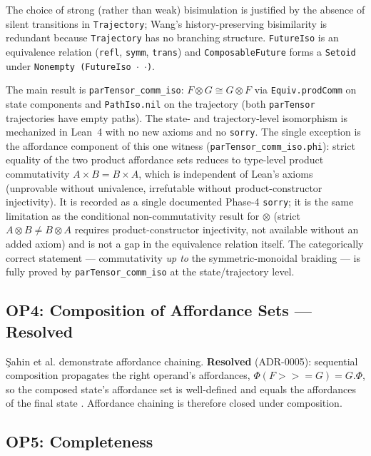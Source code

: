 \documentclass[11pt,a4paper]{article}
\newcommand{\seqBind}{\mathbin{>>=}}
\begin{document}
The choice of strong (rather than weak) bisimulation is justified by the absence of silent transitions in \texttt{Trajectory}; Wang's history-preserving bisimilarity is redundant because \texttt{Trajectory} has no branching structure. \texttt{FutureIso} is an equivalence relation (\texttt{refl}, \texttt{symm}, \texttt{trans}) and \texttt{ComposableFuture} forms a \texttt{Setoid} under \texttt{Nonempty~(FutureIso~$\cdot$~$\cdot$)}.

The main result is \texttt{parTensor\_comm\_iso}: $F \otimes G \cong G \otimes F$ via \texttt{Equiv.prodComm} on state components and \texttt{PathIso.nil} on the trajectory (both \texttt{parTensor} trajectories have empty paths). The state- and trajectory-level isomorphism is mechanized in Lean~4 with no new axioms and no \texttt{sorry}. The single exception is the affordance component of this one witness (\texttt{parTensor\_comm\_iso.phi}): strict equality of the two product affordance sets reduces to type-level product commutativity $A \times B = B \times A$, which is independent of Lean's axioms (unprovable without univalence, irrefutable without product-constructor injectivity). It is recorded as a single documented Phase-4 \texttt{sorry}; it is the same limitation as the conditional non-commutativity result for $\otimes$ (strict $A \otimes B \neq B \otimes A$ requires product-constructor injectivity, not available without an added axiom) and is not a gap in the equivalence relation itself. The categorically correct statement --- commutativity \emph{up to} the symmetric-monoidal braiding --- is fully proved by \texttt{parTensor\_comm\_iso} at the state/trajectory level.

\subsection{OP4: Composition of Affordance Sets — \textbf{Resolved}}

Şahin et al. \cite{sahin2007} demonstrate affordance chaining. \textbf{Resolved}
(ADR-0005): sequential composition propagates the right operand's affordances,
$\Phi(F \seqBind G) = G.\Phi$, so the composed state's affordance set is
well-defined and equals the affordances of the final state
.
Affordance chaining is therefore closed under composition.

\subsection{OP5: Completeness}
\end{document}
